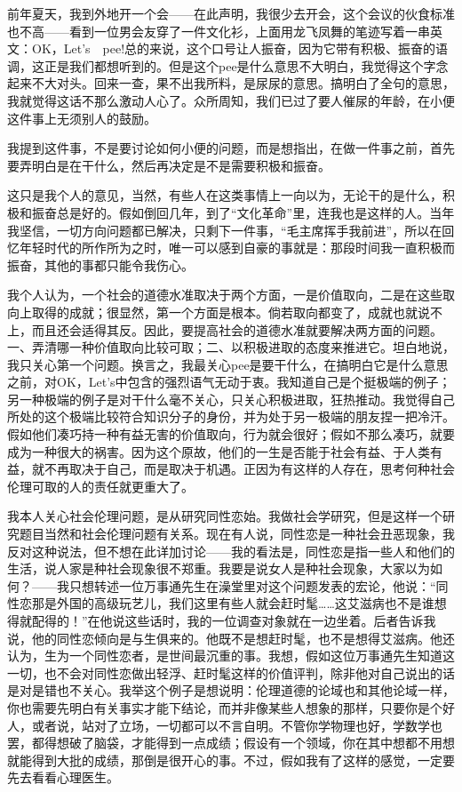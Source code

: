 前年夏天，我到外地开一个会——在此声明，我很少去开会，这个会议的伙食标准也不高——看到一位男会友穿了一件文化衫，上面用龙飞凤舞的笔迹写着一串英文：OK，Let’s　pee!总的来说，这个口号让人振奋，因为它带有积极、振奋的语调，这正是我们都想听到的。但是这个pee是什么意思不大明白，我觉得这个字念起来不大对头。回来一查，果不出我所料，是尿尿的意思。搞明白了全句的意思，我就觉得这话不那么激动人心了。众所周知，我们已过了要人催尿的年龄，在小便这件事上无须别人的鼓励。 

我提到这件事，不是要讨论如何小便的问题，而是想指出，在做一件事之前，首先要弄明白是在干什么，然后再决定是不是需要积极和振奋。 

这只是我个人的意见，当然，有些人在这类事情上一向以为，无论干的是什么，积极和振奋总是好的。假如倒回几年，到了“文化革命”里，连我也是这样的人。当年我坚信，一切方向问题都已解决，只剩下一件事，“毛主席挥手我前进”，所以在回忆年轻时代的所作所为之时，唯一可以感到自豪的事就是：那段时间我一直积极而振奋，其他的事都只能令我伤心。 

我个人认为，一个社会的道德水准取决于两个方面，一是价值取向，二是在这些取向上取得的成就；很显然，第一个方面是根本。倘若取向都变了，成就也就说不上，而且还会适得其反。因此，要提高社会的道德水准就要解决两方面的问题。一、弄清哪一种价值取向比较可取；二、以积极进取的态度来推进它。坦白地说，我只关心第一个问题。换言之，我最关心pee是要干什么，在搞明白它是什么意思之前，对OK，Let’s中包含的强烈语气无动于衷。我知道自己是个挺极端的例子；另一种极端的例子是对干什么毫不关心，只关心积极进取，狂热推动。我觉得自己所处的这个极端比较符合知识分子的身份，并为处于另一极端的朋友捏一把冷汗。假如他们凑巧持一种有益无害的价值取向，行为就会很好；假如不那么凑巧，就要成为一种很大的祸害。因为这个原故，他们的一生是否能于社会有益、于人类有益，就不再取决于自己，而是取决于机遇。正因为有这样的人存在，思考何种社会伦理可取的人的责任就更重大了。 

我本人关心社会伦理问题，是从研究同性恋始。我做社会学研究，但是这样一个研究题目当然和社会伦理问题有关系。现在有人说，同性恋是一种社会丑恶现象，我反对这种说法，但不想在此详加讨论——我的看法是，同性恋是指一些人和他们的生活，说人家是种社会现象很不郑重。我要是说女人是种社会现象，大家以为如何？——我只想转述一位万事通先生在澡堂里对这个问题发表的宏论，他说：“同性恋那是外国的高级玩艺儿，我们这里有些人就会赶时髦……这艾滋病也不是谁想得就配得的！”在他说这些话时，我的一位调查对象就在一边坐着。后者告诉我说，他的同性恋倾向是与生俱来的。他既不是想赶时髦，也不是想得艾滋病。他还认为，生为一个同性恋者，是世间最沉重的事。我想，假如这位万事通先生知道这一切，也不会对同性恋做出轻浮、赶时髦这样的价值评判，除非他对自己说出的话是对是错也不关心。我举这个例子是想说明：伦理道德的论域也和其他论域一样，你也需要先明白有关事实才能下结论，而并非像某些人想象的那样，只要你是个好人，或者说，站对了立场，一切都可以不言自明。不管你学物理也好，学数学也罢，都得想破了脑袋，才能得到一点成绩；假设有一个领域，你在其中想都不用想就能得到大批的成绩，那倒是很开心的事。不过，假如我有了这样的感觉，一定要先去看看心理医生。 

